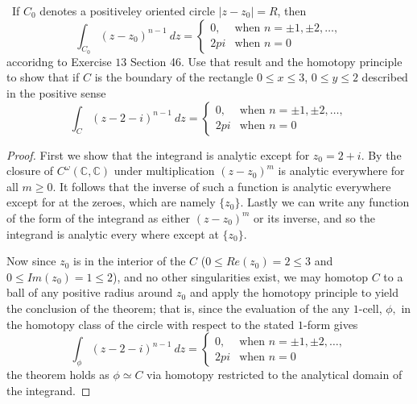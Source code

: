 \documentclass[11pt]{amsart}
\theoremstyle{definition}
\numberwithin{theorem}{section}
\numberwithin{definition}{section}
\numberwithin{equation}{section}
\begin{document}
\medskip {}\ If $C_0$ denotes a positiveley oriented circle $|z - z_0| = R$, then
\begin{equation*}
	\int_{C_0}(z- z_0)^{n-1}\ dz = \begin{cases}
		0, &\text{when } n = \pm1, \pm2, \dots, \\
		2pi &\text{when } n = 0 
	\end{cases}
\end{equation*}
accoridng to Exercise $13$ Section 46. Use that result and the homotopy principle to show that if $C$ is the boundary
of the rectangle $0 \leq x \leq 3$, $0 \leq y \leq 2$ described in the positive sense
\begin{equation*}
	\int_C (z -2 -i)^{n-1}\ dz =  \begin{cases}
		0, &\text{when } n = \pm1, \pm2, \dots, \\
		2pi &\text{when } n = 0 
		\end{cases}
\end{equation*}
\begin{proof}
	First we show that the integrand is analytic except for $z_0 = 2 + i$. By the closure of $C^{\omega}(\mathbb{C}, \mathbb{C})$ under multiplication $(z - z_0)^{m}$ is analytic everywhere for all $m \geq 0$. It follows that the inverse of such a function is analytic everywhere except for at the zeroes, which are namely $\{z_0\}$. Lastly we can write any function of the form of the integrand as either  $(z - z_0)^{m}$ or its inverse, and so the integrand is analytic every where except at $\{z_0\}$.

	Now since $z_0$ is in the interior of the $C$ ($0 \leq Re(z_0) = 2 \leq 3$ and $0 \leq Im(z_0) = 1 \leq 2$), and no other 
	singularities exist, we may homotop $C$ to a ball of any positive radius around $z_0$ and apply the homotopy principle to yield the conclusion of the theorem; that is, since the evaluation of the any $1$-cell, $\phi,$ in the homotopy class of the circle with respect to the stated $1$-form gives 
	\begin{equation*}
		\int_\phi (z -2 -i)^{n-1}\ dz =  \begin{cases}
		0, &\text{when } n = \pm1, \pm2, \dots, \\
		2pi &\text{when } n = 0 
		\end{cases}
	\end{equation*}
	the theorem holds as $\phi \simeq C$ via homotopy restricted to the analytical domain of the integrand.
\end{proof}
\end{document}

